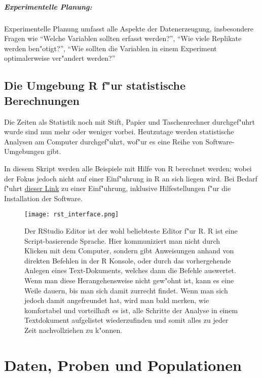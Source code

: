 \documentclass[a4paper,twoside]{tufte-book}\usepackage[]{graphicx}\usepackage[]{color}
\begin{document}
	\paragraph{Experimentelle Planung:} Experimentelle Planung umfasst alle Aspekte der Datenerzeugung, insbesondere Fragen wie "`Welche Variablen sollten erfasst werden?"', "`Wie viele Replikate werden ben"otigt?"', "`Wie sollten die Variablen in einem Experiment optimalerweise ver"andert werden?"'
	
	
	\section{Die Umgebung R f"ur statistische Berechnungen}
	
	Die Zeiten als Statistik noch mit Stift, Papier und Taschenrechner durchgef"uhrt wurde sind nun mehr oder weniger vorbei. Heutzutage werden statistische Analysen am Computer durchgef"uhrt, wof"ur es eine Reihe von Software-Umgebungen gibt.
	
	In diesem Skript werden alle Beispiele mit Hilfe von R berechnet werden; wobei der Fokus jedoch nicht auf einer Einf"uhrung in R an sich liegen wird. Bei Bedarf f"uhrt  \href{http://biometry.github.io/APES/R/R10-gettingStarted.html}{dieser Link} zu einer Einf"uhrung, inklusive Hilfestellungen f"ur die Installation der Software.
	
	\begin{figure}[]
		\begin{center}
			\texttt{[image: rst\_interface.png]}
			\caption{Der RStudio Editor ist der wohl beliebteste Editor f"ur R. R ist eine Script-basierende Sprache. Hier kommuniziert man nicht durch Klicken mit dem Computer, sondern gibt Anweisungen anhand von direkten Befehlen in der R Konsole, oder durch das vorhergehende Anlegen eines Text-Dokuments, welches dann die Befehle auswertet. Wenn man diese Herangehensweise nicht gew"ohnt ist, kann es eine Weile dauern, bis man sich damit zurrecht findet. Wenn man sich jedoch damit angefreundet hat, wird man bald merken, wie komfortabel und vorteilhaft es ist, alle Schritte der Analyse in einem Textdokument aufgelistet wiederzufinden und somit alles zu jeder Zeit nachvollziehen zu k"onnen.}
			\label{fig: Rstudio}
		\end{center}
	\end{figure}
	
	
	
	\chapter{Daten, Proben und Populationen}
	
\end{document}
